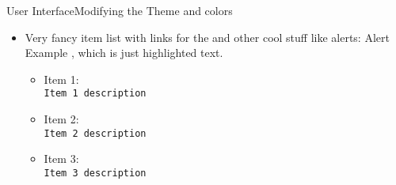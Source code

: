 \begin{frame}{User Interface}{Modifying the Theme and colors}
  \begin{itemize}
    \item<1-> Very fancy item list with links for the   and other cool stuff like alerts: \alert{Alert Example} , which is just highlighted text.
      \begin{itemize}
        \item Item 1:\\
        {\tt Item 1 description}
        \item Item 2:\\
        {\tt Item 2 description}\\
        \item Item 3:\\
        {\tt Item 3 description}
      \end{itemize}
  \end{itemize}
\end{frame}